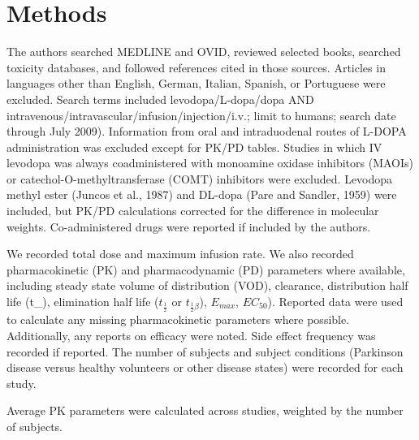 \section{Methods}
The authors searched MEDLINE and OVID, reviewed selected books, searched toxicity databases, and followed references cited in those sources. Articles in languages other than English, German, Italian, Spanish, or Portuguese were excluded. Search terms included levodopa/L-dopa/dopa AND intravenous/intravascular/infusion/injection/i.v.; limit to humans; search date through July 2009). Information from oral and intraduodenal routes of L-DOPA administration was excluded except for PK/PD tables.  Studies in which IV levodopa was always coadministered with monoamine oxidase inhibitors (MAOIs) or catechol-O-methyltransferase (COMT) inhibitors were excluded.  Levodopa methyl ester (Juncos et al., 1987) and DL-dopa (Pare and Sandler, 1959) were included, but PK/PD calculations corrected for the difference in molecular weights.  Co-administered drugs were reported if included by the authors.

We recorded total dose and maximum infusion rate.  We also recorded pharmacokinetic (PK) and pharmacodynamic (PD) parameters where available, including steady state volume of distribution (VOD), clearance, distribution half life (t_{\alpha}), elimination half life ($t_{\frac{1}{2}}$ or $t_{\frac{1}{2}\beta}$), $E_{max}$, $EC_{50}$).   Reported data were used to calculate any missing pharmacokinetic parameters where possible.  Additionally, any reports on efficacy were noted.  Side effect frequency was recorded if reported. The number of subjects and subject conditions (Parkinson disease versus healthy volunteers or other disease states) were recorded for each study. 

Average PK parameters were calculated across studies, weighted by the number of subjects.